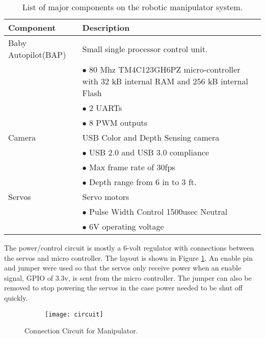 \begin{longtable}{| p{3cm} | p{10cm} |}
		\caption{List of major components on the robotic manipulator system.}
		\label{tab: Components}\\

 		\hline
 		 Component & Description \\ \hline 
 		\endhead
 		

 		
 		\hline \hline
 		\endlastfoot
 		
 		Baby Autopilot(BAP) & Small single processor control unit. 
	 		\\ & $ \bullet $ 80 Mhz TM4C123GH6PZ micro-controller with 32 kB internal RAM and 256 kB internal Flash  
	 		\\  & $ \bullet $ 2 UARTs  
 			\\  & $ \bullet $ 8 PWM outputs	
 		\\ \hline
		Camera & USB Color and Depth Sensing camera
			\\  & $ \bullet $ USB 2.0 and USB 3.0 compliance
	 		\\  & $ \bullet $ Max frame rate of 30fps
	 		\\  & $ \bullet $ Depth range from 6 in to 3 ft. 
 		\\ \hline

 		Servos & Servo motors  
 			\\  & $ \bullet $ Pulse Width Control 1500usec Neutral
 			\\  & $ \bullet $ 6V operating voltage
 			 			 			 		
 		\\ \hline 
	\end{longtable}

The power/control circuit is mostly a 6-volt regulator with connections between the servos and micro controller. The layout is shown in Figure \ref{fig:circuit}. An enable pin and jumper were used so that the servos only receive power when an enable signal, GPIO of 3.3v, is sent from the micro controller. The jumper can also be removed to stop powering the servos in the case power needed to be shut off quickly.

\begin{figure}[h]
    \centering
    \begin{subfigure}[b]{0.3\textwidth}
    	\texttt{[image: circuit]}
   	 \end{subfigure}
   	 \quad

 	\caption{Connection Circuit for Manipulator. }
 	\label{fig:circuit}
\end{figure}

